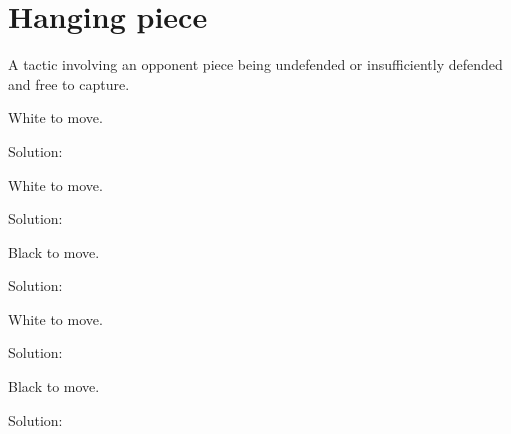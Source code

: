 \documentclass{book}
\begin{document}
\section{Hanging piece}
A tactic involving an opponent piece being undefended or insufficiently defended and free to capture.\begin{multicols}{2} 
\begin{samepage} 
\newgame 


 
\showboard
 
 White to move. 
 
Solution: 
 
\end{samepage}\begin{samepage} 
\newgame 


 
\showboard
 
 White to move. 
 
Solution: 
 
\end{samepage}\begin{samepage} 
\newgame 


 
\showboard
 
 Black to move. 
 
Solution: 
 
\end{samepage}\begin{samepage} 
\newgame 


 
\showboard
 
 White to move. 
 
Solution: 
 
\end{samepage}\begin{samepage} 
\newgame 


 
\showboard
 
 Black to move. 
 
Solution: 
 
\end{samepage}\end{multicols} 
\newpage 
\end{document}
